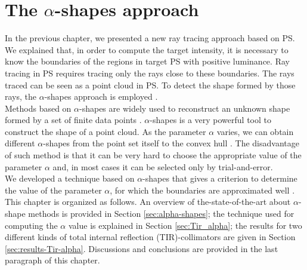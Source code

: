 \chapter{The $\alpha$-shapes approach}\label{chap:boundaries_alpha}
In the previous chapter, we presented a new ray tracing approach based on PS. We explained that, in order to compute the target intensity, it is necessary to know the boundaries of the regions in target PS with positive luminance. Ray tracing in PS requires tracing only the rays close to these boundaries. The rays traced can be seen as a point cloud in PS. To detect the shape formed by those rays, the $\alpha$-shapes approach is employed \cite{portegies2013fast}.\\ \indent
Methods based on $\alpha$-shapes are widely used to reconstruct an unknown shape formed by a set of finite data points \cite{guo1997surface}. $\alpha$-shapes is a very powerful tool to construct the shape of a point cloud. As the parameter $\alpha$ varies, we can obtain different $\alpha$-shapes from the point set itself to the convex
hull \cite{xu2003automatic}. The disadvantage of such method is that it can be very hard to choose the appropriate value of the parameter $\alpha$ and, in most cases it can be selected only by trial-and-error.\\ \indent
We developed a technique based on $\alpha$-shapes that gives a criterion to determine the value of the parameter $\alpha$, for which the boundaries are approximated well \cite{filosa2015new}.\\ \indent This chapter is organized as follows. An overview of the-state-of-the-art about $\alpha$-shape methods is provided in Section \ref{sec:alpha-shapes}; the technique used for computing the $\alpha$ value is explained in Section \ref{sec:Tir_alpha}; the results for two different kinds of total internal reflection (TIR)-collimators are given in Section \ref{sec:results-Tir-alpha}. Discussions and conclusions are provided in the last paragraph of this chapter.

